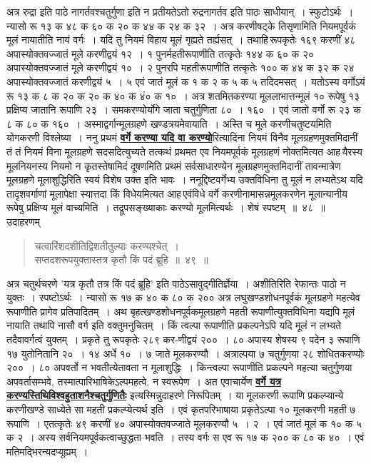 \documentclass[11pt, openany]{book}
\begin{document}
{{ अत्र रुद्रा इति पाठे नागर्तवश्चतुर्गुणा इति न प्रतीयतेऽतो रुद्रनागर्तव
इति पाठः साधीयान्~। स्फुटोऽर्थः~। न्यासो रू १३ क ४८ क ६० क २० क 
४४ क २४ क ३२~। अत्र करणीषट्के तिसृणामिति नियमपूर्वकं मूलं नायातीति
\newpage
\noindent नायं वर्गः~। यदि तु नियमं विहाय मूलं गृह्यते तर्ह्यसत्~।
तथाहि\textendash \,रूपकृतेः
१६९ करणीं ४८ अपास्योक्तवज्जातं मूले करणीद्वयं १२~। १ पुनर्महतीरूपाणीति
तत्कृतेः १४४ क ६० क २० अपास्योक्तवज्जातं मूले करणीद्वयं १०~। २ 
पुनरपि महतीरूपाणीति तत्कृतेः १०० क ४४ क ३२ क २४ अपास्योक्तवज्जातं
करणीद्वयं ५~। ५ एवं जातं मूलं क १ क २ क ५ क ५ तदिदमसत्~।
यतोऽस्य वर्गोऽयं रू १३ क ८ क २० क २० क ४० क ४ं० क १०~। अत्र 
शतमितकरण्या मूललाभात्तन्मूलं १० रूपेषु १३ प्रक्षिप्य जातानि रूपाणि २३~।
समकरण्योर्योगे जाता चतुर्गुणिता ८०~। १६०~। एवं जातो वर्गो रू २३ क ८
क ८० क १६०~। अस्माद्वर्गान्मूलग्रहणे खण्डत्रयमेवायाति~। अस्ति च मूले 
करणीचतुष्टयमिति योगकरणी विश्लेष्या~। ननु प्रथमं \hyperref[41]{\textbf{वर्गे करण्या यदि वा करण्यो}}रित्यादिना नियमं विनैव मूलग्रहणमुक्तमिदानीं तं तं नियमं विना मूलग्रहणे 
सदसदित्युच्यते तत्कथं प्रथमत एव नियमपूर्वकं मूलग्रहणं नोक्तमित्यत आह\textendash \,यैरस्य मूलनियनस्य नियमो न कृतस्तेषामिदं दूषणमिति प्रथमं सर्वसाधारण्येन
मूलग्रहणमुक्तमिदानीं तावन्मात्रेण मूलग्रहणे मूलाशुद्धिरिति स्वयं विशेष
उक्त इति  भावः~। ननूद्दिष्टवर्गेभ्य उक्तविधिना तु मूलं न लभ्यतेऽथ यदि
तादृशवर्गाणां मूलापेक्षा स्यात्तदा किं विधेयमित्यत आह\textendash \,एवंविधे वर्गे करणीनामासन्नमूलकरणेन
मूलान्यानीय रूपेषु प्रक्षिप्य मूलं वाच्यमिति~। तद्रूपसङ्ख्याकाः करण्यो
मूलमित्यर्थः~। शेषं स्पष्टम्~॥~४८~॥\\

\vspace{-2mm}
{\bqt उदाहरणम्\textendash}
\begin{quote}
    \eg 
     चत्वारिंशदशीतिद्विशतीतुल्याः करण्यश्चेत्~। \\
 सप्तदशरूपयुक्तास्तत्र कृतौ किं पदं ब्रूहि~॥~४९~॥
\end{quote}

 अत्र चतुर्थचरणे 'यत्र कृतौ तत्र किं पदं ब्रूहि' इति पाठेऽसावुद्गीतिर्ज्ञेया~। 
अशीतिरिति रेफान्तः पाठो न युक्तः~। स्पष्टोऽर्थः~। न्यासो रू १७ क ४० क 
८० क २०० अत्र लघुखण्डशोधनपूर्वकं मूलग्रहणे महत्येव रूपाणीति प्रागेव
प्रतिपादितम्~। अथ बृहत्खण्डशोधनपूर्वकमूलग्रहणे महती रूपाणीत्युक्तविधिना
यद्यपि मूलं नायाति तथापि नासौ वर्ग इति वक्तुमनुचितम्~। किं त्वल्पा
रूपाणीति
\newpage
\noindent प्रकल्पनेऽपि यदि मूलं न लभ्यते तदैवावर्गत्वं युक्तम्~। प्रकृते तु
रूपकृतेः २८९  कर-णीद्वयं २००~। ८० अपास्य शेषस्य ९ पदेन ३ रूपाणि १७ युतोनितानि २०~। १४ अर्धे १०~। ७ जाते मूलकरण्यौ~। अत्राल्पया ७ चतुर्गुणया २८ शोधितकरण्योः
२००~। ८० अपवर्तो न भवतीत्येतावता न मूलाशुद्धिः~। किन्त्वल्पा रूपाणीति 
प्रकल्पने महत्या चतुर्गुणया अपवर्तासम्भवे, तस्मात्पारिभाषिकेऽल्पमहत्वे,
न स्वरूपेण~। 
अत एवाचार्येण \hyperref[46]{\textbf{वर्गे यत्र करण्यस्तिथिविश्वहुताशनैश्चतुर्गुणितैः}} इत्यस्मिन्नुदाहरणे 
निरूपितम्~। या मूलकरणी रूपाणि प्रकल्प्यान्ये करणीखण्डे साध्येते सा महती
प्रकल्प्येत्यर्थ इति~। एवं कृतपरिभाषाया प्रकृतेऽल्पा १० मूलकरणी महती ७ रूपाणि~। एतत्कृतेः ४९ करणीं ४० अपास्योक्तवज्जाते मूलकरण्यौ ५~। २~। एवं जातं मूलं क १० क ५ क २~। अस्य सर्वनियमपूर्वकत्वाच्छुद्धता भवति~। तस्य वर्गः स एव रू १७ क २०० क ८० क ४०~। एवं मतिमद्भिरन्यदप्यूह्यम्~।

}}
\end{document}
